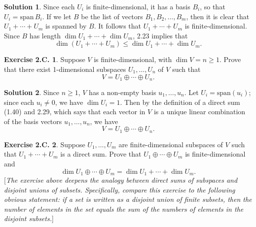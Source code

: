 \documentclass[12pt]{article}
\theoremstyle{definition}
\theoremstyle{exercise}
\newtheorem{exercise}{Exercise 2.C.}
\theoremstyle{solution}
\newtheorem*{solution}{Solution}
\newcommand{\Span}{\text{span}}
\begin{document}
\begin{solution}
    Since each \( U_i \) is finite-dimensional, it has a basis \( B_i \), so that \( U_i = \Span\,B_i \). If we let \( B \) be the list of vectors \( B_1, B_2, \ldots, B_m \), then it is clear that \( U_1 + \cdots + U_m \) is spanned by \( B \). It follows that \( U_1 + \cdots + U_m \) is finite-dimensional. Since \( B \) has length \( \dim U_1 + \cdots + \dim U_m \), 2.23 implies that
    \[
        \dim (U_1 + \cdots + U_m) \leq \dim U_1 + \cdots + \dim U_m.
    \]
\end{solution}

\begin{exercise}
\label{ex:15}
    Suppose \( V \) is finite-dimensional, with \( \dim V = n \geq 1 \). Prove that there exist 1-dimensional subspaces \( U_1, \ldots, U_n \) of \( V \) such that
    \[
        V = U_1 \oplus \cdots \oplus U_n.
    \]
\end{exercise}

\begin{solution}
    Since \( n \geq 1 \), \( V \) has a non-empty basis \( u_1, \ldots, u_n \). Let \( U_i = \Span(u_i) \); since each \( u_i \neq 0 \), we have \( \dim U_i = 1 \). Then by the definition of a direct sum (1.40) and 2.29, which says that each vector in \( V \) is a unique linear combination of the basis vectors \( u_1, \ldots, u_n \), we have
    \[
        V = U_1 \oplus \cdots \oplus U_n.
    \]
\end{solution}

\begin{exercise}
\label{ex:16}
    Suppose \( U_1, \ldots, U_m \) are finite-dimensional subspaces of \( V \) such that \( U_1 + \cdots + U_m \) is a direct sum. Prove that \( U_1 \oplus \cdots \oplus U_m \) is finite-dimensional and
    \[
        \dim U_1 \oplus \cdots \oplus U_m = \dim U_1 + \cdots + \dim U_m.
    \]
    [\textit{The exercise above deepens the analogy between direct sums of subspaces and disjoint unions of subsets. Specifically, compare this exercise to the following obvious statement: if a set is written as a disjoint union of finite subsets, then the number of elements in the set equals the sum of the numbers of elements in the disjoint subsets.}]
\end{exercise}
\end{document}
